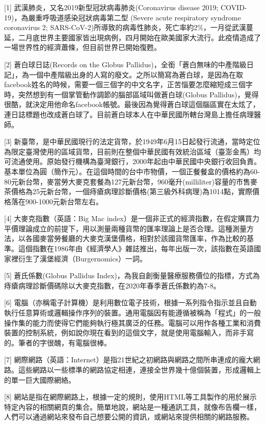 \documentclass[
]{article}
\begin{document}
{[}1{]} 武漢肺炎，又名2019新型冠狀病毒肺炎(Coronavirus disease 2019;
COVID-19)，為嚴重呼吸道感染冠狀病毒第二型 (Severe acute respiratory
syndrome coronavirus 2;
SARS-CoV-2)所導致的病毒性肺炎，死亡率約2\%，一月從武漢蔓延，二月底世界主要國家皆出現病例，四月開始在歐美國家大流行。此疫情造成了一場世界性的經濟蕭條，但目前世界已開始復甦。

{[}2{]} 蒼白球日誌(Records on the Globus
Pallidus)，全銜「蒼白無味的中產階級日記」，為一個中產階級出身的人寫的廢文。之所以簡寫為蒼白球，是因為在取facebook姓名的時候，需要一個三個字的中文名字，正苦惱要怎麼縮短成三個字時，突然想到有一個掌管動作調節的腦部區域叫做蒼白球(Globus
Pallidus)，覺得很酷，就決定用他命名facebook帳號。最後因為覺得蒼白球這個腦區實在太炫了，連日誌標題也改成蒼白球了。目前蒼白球本人在中華民國所轄台灣島上擔任病理醫師。

{[}3{]}
新臺幣，是中華民國現行的法定貨幣，於1949年6月15日起發行流通，當時定位為限定臺灣使用的區域貨幣，目前則在整個中華民國有效統治區域（臺澎金馬）均可流通使用。原始發行機構為臺灣銀行，2000年起由中華民國中央銀行收回負責。基本單位為圓（簡作元）。在這個時間的台中市物價，一個正餐餐盒的價格約為60-80元新台幣，麥當勞大麥克套餐為127元新台幣，960毫升(milliliter)容量的市售麥茶價格為25元新台幣，一個痔瘡病理診斷價格(第三級外科病理)為1014點，實際價格落在900-1000元新台幣左右。

{[}4{]} 大麥克指數（英語：Big Mac
index）是一個非正式的經濟指數，在假定購買力平價理論成立的前提下，用以測量兩種貨幣的匯率理論上是否合理。這種測量方法，以各國麥當勞餐廳的大麥克漢堡價格，相對於該國貨幣匯率，作為比較的基準。這個指數在1986年由《經濟學人》雜誌推出，每年出版一次，該指數在英語國家裡衍生了漢堡經濟（Burgernomics）一詞。

{[}5{]} 蒼氏係數(Globus Pallidus
Index)，為我自創衡量醫療服務價位的指標，方式為痔瘡病理診斷價碼除以大麥克指數，在2020年春季蒼氏係數約為7-8。

{[}6{]}
電腦（亦稱電子計算機）是利用數位電子技術，根據一系列指令指示並且自動執行任意算術或邏輯操作序列的裝置。通用電腦因有能遵循被稱為「程式」的一般操作集的能力而使得它們能夠執行極其廣泛的任務。電腦可以用作各種工業和消費裝置的控制系統，例如說你現在看到的這個文字，就是使用電腦輸入，而非手寫的。筆者的字很醜，有電腦很棒。

{[}7{]}
網際網路（英語：Internet）是指21世紀之初網路與網路之間所串連成的龐大網路。這些網路以一些標準的網路協定相連，連接全世界幾十億個裝置，形成邏輯上的單一巨大國際網絡。

{[}8{]}
網站是指在網際網路上，根據一定的規則，使用HTML等工具製作的用於展示特定內容的相關網頁的集合。簡單地說，網站是一種通訊工具，就像布告欄一樣，人們可以通過網站來發布自己想要公開的資訊，或網站來提供相關的網路服務。
\end{document}
